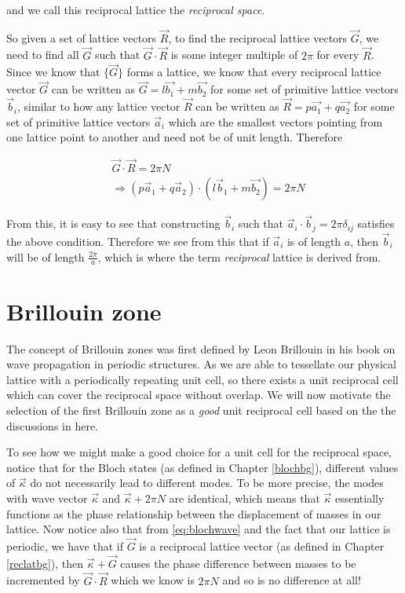 and we call this reciprocal lattice the \textit{reciprocal space}.

So given a set of lattice vectors $\vec{R}$, to find the reciprocal lattice
vectors $\vec{G}$, we need to find all $\vec{G}$ such that
$\vec{G}\cdot\vec{R}$ is some integer multiple of $2\pi$ for every $\vec{R}$.
Since we know that $\{\vec{G}\}$ forms a lattice, we know that every reciprocal
lattice vector $\vec{G}$ can be written as $\vec{G}=l\vec{b_1}+m\vec{b_2}$ for
some set of primitive lattice vectors $\vec{b}_i$, similar to how any lattice
vector $\vec{R}$ can be written as $\vec{R}=p\vec{a_1}+q\vec{a_2}$ for some set
of primitive lattice vectors $\vec{a}_i$ which are the smallest vectors
pointing from one lattice point to another and need not be of unit length.
Therefore 

\begin{align}
  &\vec{G}\cdot\vec{R}=2\pi N \\
  &\Rightarrow (p\vec{a}_1+q\vec{a}_2)\cdot(l\vec{b}_1+m\vec{b_2})=2\pi N
\end{align}

From this, it is easy to see that constructing $\vec{b}_i$ such that
$\vec{a}_i\cdot\vec{b}_j=2\pi\delta_{ij}$ satisfies the above condition.
Therefore we see from this that if $\vec{a}_i$ is of length $a$, then
$\vec{b}_i$ will be of length $\frac{2\pi}{a}$, which is where the term
\textit{reciprocal} lattice is derived from.

\section{Brillouin zone}
\label{brizones}

The concept of Brillouin zones was first defined by Leon Brillouin in his book
on wave propagation in periodic structures.\cite{brillouin} As we are able to
tessellate our physical lattice with a periodically repeating unit cell, so
there exists a unit reciprocal cell which can cover the reciprocal space
without overlap. We will now motivate the selection of the first Brillouin zone
as a \textit{good} unit reciprocal cell based on the the discussions in
here.\cite{moldinglight}

To see how we might make a good choice for a unit cell for the reciprocal
space, notice that for the Bloch states (as defined in Chapter \ref{blochbg}),
different values of $\vec{\kappa}$ do not necessarily lead to different modes.
To be more precise, the modes with wave vector $\vec{\kappa}$ and
$\vec{\kappa}+2\pi N$ are identical, which means that $\vec{\kappa}$
essentially functions as the phase relationship between the displacement of
masses in our lattice. Now notice also that from \eqref{eq:blochwave} and the
fact that our lattice is periodic, we have that if $\vec{G}$ is a reciprocal
lattice vector (as defined in Chapter \ref{reclatbg}), then
$\vec{\kappa}+\vec{G}$ causes the phase difference between masses to be
incremented by $\vec{G}\cdot\vec{R}$ which we know is $2\pi N$ and so is no
difference at all!

